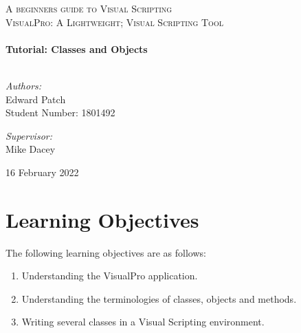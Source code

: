 \documentclass[10pt]{article}
\begin{document}
\begin{center}
\textsc{\LARGE A beginners guide to Visual Scripting}\\[1.5cm]													%

\textsc{\Large VisualPro: A Lightweight; Visual Scripting Tool}\\[0.5cm]

 			\vspace*{1cm}																		%
\HRule \\[0.4cm]																	%
{ \huge \bfseries Tutorial: Classes and Objects}\\[0.4cm]	%
\HRule \\[1.5cm]																	%
\begin{minipage}{0.4\textwidth}													%
\begin{flushleft} \large															
\textit{Authors:}\\
Edward Patch\\
Student Number: 1801492\\
\end{flushleft}																		%
\end{minipage}		
\begin{minipage}{0.5\textwidth}		
\vspace{-0.6cm}											%
\begin{flushright} \large															%
\textit{Supervisor:} \\
Mike Dacey														%
\end{flushright}																	%
\end{minipage}	
\vspace*{1cm}

\vspace{2cm} 																				
\begin{center}																					
{\large 16 February 2022}																	%
 			\end{center}												  						
\end{center}							 											
																					
\newpage																		

\tableofcontents
\thispagestyle{fancy}

\newpage
\section{Learning Objectives}
The following learning objectives are as follows:
\begin{enumerate}
    \item Understanding the VisualPro application.
    \item Understanding the terminologies of classes, objects and methods.
    \item Writing several classes in a Visual Scripting environment.
\end{enumerate}
\end{document}
